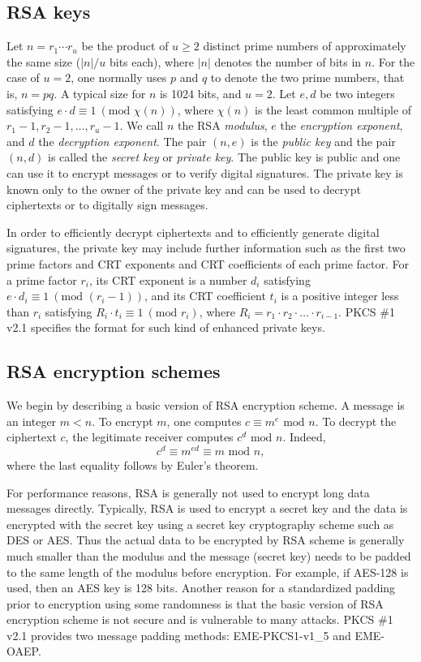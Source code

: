 \documentclass{article}
\begin{document}
\subsection{RSA keys}
Let $n=r_1\cdots r_{u}$ be the product 
of $u\ge 2$ distinct prime numbers of approximately 
the same size ($|n|/u$ bits each), where $|n|$ denotes the number of 
bits in $n$. For the case of $u=2$, 
one normally uses $p$ and $q$ to denote the two prime numbers,
that is, $n=pq$. A typical size for $n$ is 
1024 bits, and $u=2$. Let $e,d$ be two integers satisfying 
$e\cdot d \equiv 1 \ (\mbox{mod }\chi (n))$, where $\chi(n)$ is the least
common multiple of $r_1-1, r_2-1, \ldots, r_u-1$. 
We call $n$ the RSA {\em modulus}, $e$ the {\em encryption exponent},
and $d$ the {\em decryption exponent}. The pair $(n,e)$ is the 
{\em public key} and the pair $(n,d)$ is called the {\em secret key}
or {\em private key}. The public key is public and one can use it
to encrypt messages or to verify digital signatures. The private key 
is known only to the owner of the private key and can be
used to decrypt ciphertexts or to digitally sign messages.

In order to efficiently decrypt ciphertexts and to efficiently generate
digital signatures, the private key may include further information 
such as the first two prime factors and  CRT exponents and CRT 
coefficients of each prime factor. For a prime factor $r_i$, its CRT exponent
is a number $d_i$ satisfying $e\cdot d_i\equiv 1\ (\mbox{mod }(r_i-1))$,
and its  CRT coefficient $t_i$ is a positive integer 
less than $r_i$ satisfying $R_i\cdot t_i\equiv 1\ (\mbox{mod }r_i)$,
where $R_i = r_1\cdot r_2\cdot\ldots\cdot r_{i-1}$.
PKCS \#1 v2.1 specifies the format
for such kind of enhanced private keys.

\subsection{RSA encryption schemes}
We begin by describing a basic version of 
RSA encryption scheme. A message is an integer $m<n$. To encrypt $m$, 
one computes $c\equiv m^e\mbox{ mod }n$.
To decrypt the ciphertext $c$, the legitimate receiver computes
$c^d\mbox{ mod }n$. Indeed, 
$$c^d\equiv m^{ed}\equiv m\mbox{ mod }n,$$ where
the last equality follows by Euler's theorem.

For performance reasons, RSA is generally not used to encrypt 
long data messages directly. Typically, 
RSA is used to encrypt a secret key and the data is encrypted with 
the secret key using a secret key cryptography scheme such as DES or AES.
Thus the actual data to be encrypted by RSA scheme is generally much 
smaller than the modulus and the message (secret key) needs to be 
padded to the same length of the modulus before encryption. 
For example, if AES-128 is used, then an AES key is 128 bits.
Another reason for a standardized padding
prior to encryption using some randomness is that the 
basic version of RSA encryption scheme is not secure and is 
vulnerable to many attacks. PKCS \#1 v2.1 provides two message padding 
methods: EME-PKCS1-v1\_5 and EME-OAEP. 
\end{document}
